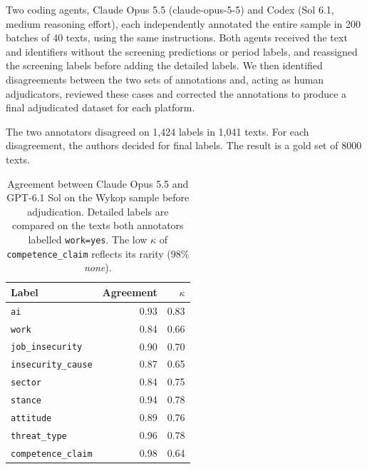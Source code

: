 \documentclass[11pt]{article}
\begin{document}
Two coding agents, Claude Opus 5.5 (claude-opus-5-5) and Codex (Sol 6.1, medium reasoning effort), each independently annotated the entire sample
in 200 batches of 40 texts, using the same instructions. Both agents
received the text and identifiers without the screening predictions or
period labels, and reassigned the screening labels before adding the
detailed labels. We then identified disagreements between the two sets
of annotations and, acting as human adjudicators, reviewed these cases
and corrected the annotations to produce a final adjudicated dataset for
each platform.

The two annotators disagreed on 1,424 labels in 1,041 texts. For each disagreement, the authors decided for final labels. The result is a gold set of 8000 texts.


\begin{table}[t]
\centering
\small
\begin{tabular}{lrr}
\toprule
Label & Agreement & $\kappa$ \\
\midrule
\texttt{ai}               & 0.93 & 0.83 \\
\texttt{work}             & 0.84 & 0.66 \\
\texttt{job\_insecurity}   & 0.90 & 0.70 \\
\texttt{insecurity\_cause} & 0.87 & 0.65 \\
\texttt{sector}           & 0.84 & 0.75 \\
\texttt{stance}           & 0.94 & 0.78 \\
\texttt{attitude}         & 0.89 & 0.76 \\
\texttt{threat\_type}      & 0.96 & 0.78 \\
\texttt{competence\_claim} & 0.98 & 0.64 \\
\bottomrule
\end{tabular}
\caption{Agreement between Claude Opus 5.5 and GPT-6.1 Sol on the Wykop
sample before adjudication. Detailed labels are compared on the texts both
annotators labelled \texttt{work=yes}. The low $\kappa$ of
\texttt{competence\_claim} reflects its rarity (98\% \textit{none}).}
\label{tab:agents}
\end{table}
\end{document}
